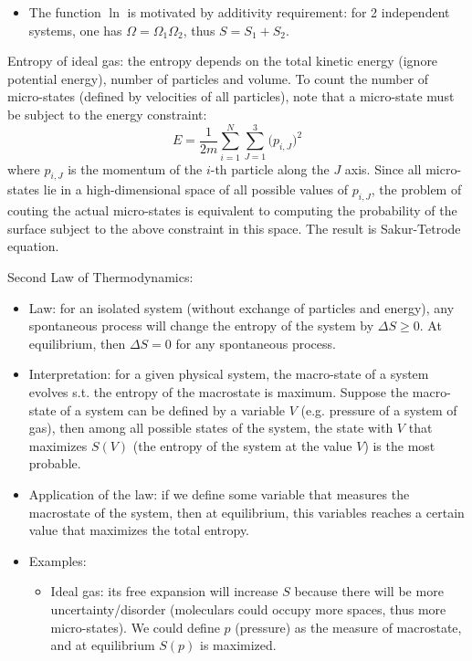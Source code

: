 \documentclass{report}
\begin{document}
\begin{enumerate}
\begin{itemize}
\item The function $\ln$ is motivated by additivity requirement: for 2 independent systems, one has $\Omega = \Omega_1 \Omega_2$, thus $S = S_1 + S_2$.  
\end{itemize}

Entropy of ideal gas: the entropy depends on the total kinetic energy (ignore potential energy), number of particles and volume. To count the number of micro-states (defined by velocities of all particles), note that a micro-state must be subject to the energy constraint: 
\begin{equation}
E = \frac{1}{2m}\sum_{i=1}^N{\sum_{J=1}^{3}{(p_{i,J}})^2}
\end{equation}
where $p_{i,J}$ is the momentum of the $i$-th particle along the $J$ axis. Since all micro-states lie in a high-dimensional space of all possible values of $p_{i,J}$, the problem of couting the actual micro-states is equivalent to computing the probability of the surface subject to the above constraint in this space. The result is Sakur-Tetrode equation. 

Second Law of Thermodynamics: 
\begin{itemize}
\item Law: for an isolated system (without exchange of particles and energy), any spontaneous process will change the entropy of the system by $\Delta S \geq 0$. At equilibrium, then $\Delta S = 0$ for any spontaneous process. 

\item Interpretation: for a given physical system, the macro-state of a system evolves s.t. the entropy of the macrostate is maximum. Suppose the macro-state of a system can be defined by a variable $V$ (e.g. pressure of a system of gas), then among all possible states of the system, the state with $V$ that maximizes $S(V)$ (the entropy of the system at the value $V$) is the most probable.   

\item Application of the law: if we define some variable that measures the macrostate of the system, then at equilibrium, this variables reaches a certain value that maximizes the total entropy. 

\item Examples: 
\begin{itemize}
\item Ideal gas: its free expansion will increase $S$ because there will be more uncertainty/disorder (moleculars could occupy more spaces, thus more micro-states). We could define $p$ (pressure) as the measure of macrostate, and at equilibrium $S(p)$ is maximized. 


\end{itemize}
\end{itemize}
\end{enumerate}
\end{document}
